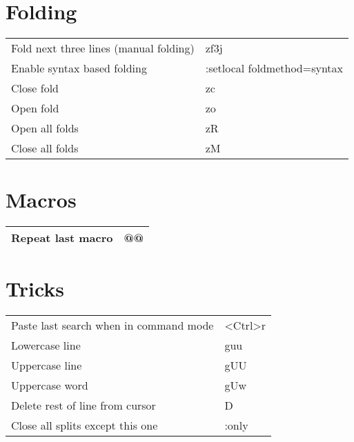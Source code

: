 \documentclass[a4paper]{report}
\def \tablewidth {10cm}
\begin{document}
\section{Folding}
\begin{tabularx}{\tablewidth}{| X | l |}
  \hline
  Fold next three lines (manual folding) & zf3j \\
  Enable syntax based folding & :setlocal foldmethod=syntax \\
  Close fold & zc \\
  Open fold & zo \\
  Open all folds & zR \\
  Close all folds & zM \\
  \hline
\end{tabularx}

\section{Macros}
\begin{tabularx}{\tablewidth}{| X | l |}
  \hline
  Repeat last macro & @@ \\
  \hline
\end{tabularx}

\section{Tricks}
\begin{tabularx}{\tablewidth}{| X | l |}
  \hline
  Paste last search when in command mode & \textless Ctrl\textgreater r \\
  Lowercase line & guu \\
  Uppercase line & gUU \\
  Uppercase word & gUw \\
  Delete rest of line from cursor & D \\
  Close all splits except this one & :only \\
  \hline
\end{tabularx}
\end{document}
